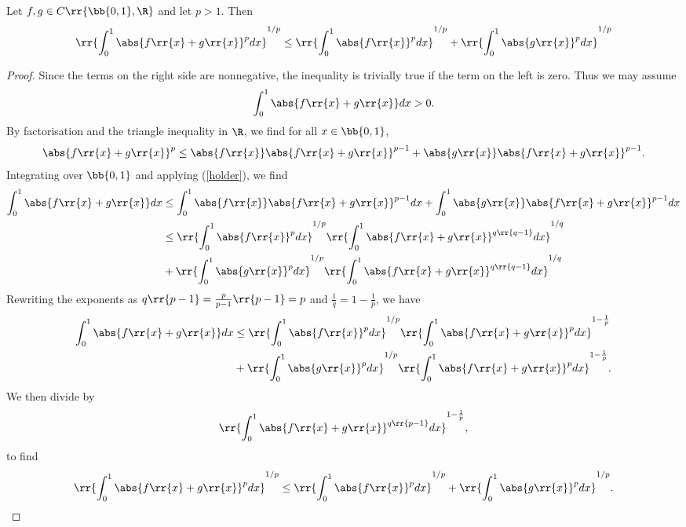 \documentclass{article}
\begin{document}
\begin{claim*}[2b]
  Let $f,g\in C\rr{\bb{0,1},\R}$ and let $p>1$. Then
  \begin{align*}
    \rr{\int_{0}^{1} \abs{f\rr{x}+g\rr{x}}^p dx}^{1/p} \leq \rr{\int_{0}^{1} \abs{f\rr{x}}^p dx}^{1/p} + \rr{\int_{0}^{1} \abs{g\rr{x}}^p dx}^{1/p}
  \end{align*}
  \begin{proof}
    Since the terms on the right side are nonnegative, the inequality is trivially true if the term on the left is zero.
    Thus we may assume
    \begin{align*}
      \int_{0}^{1} \abs{f\rr{x}+g\rr{x}} dx > 0.
    \end{align*}
    By factorisation and the triangle inequality in $\R$, we find for all $x\in\bb{0,1}$,
    \begin{align*}
      \abs{f\rr{x}+g\rr{x}}^p\leq \abs{f\rr{x}}\abs{f\rr{x}+g\rr{x}}^{p-1} + \abs{g\rr{x}}\abs{f\rr{x}+g\rr{x}}^{p-1}.
    \end{align*}
    Integrating over $\bb{0,1}$ and applying (\ref{holder}), we find
    \begin{align*}
      \int_{0}^{1} \abs{f\rr{x}+g\rr{x}} dx & \leq \int_0^1 \abs{f\rr{x}}\abs{f\rr{x}+g\rr{x}}^{p-1} dx + \int_0^1 \abs{g\rr{x}}\abs{f\rr{x}+g\rr{x}}^{p-1} dx \\
                                            & \leq \rr{\int_{0}^{1} \abs{f\rr{x}}^p dx}^{1/p} \rr{\int_{0}^{1} \abs{f\rr{x}+g\rr{x}}^{q\rr{q-1}} dx}^{1/q} \\
                                            & + \rr{\int_{0}^{1} \abs{g\rr{x}}^p dx}^{1/p} \rr{\int_{0}^{1} \abs{f\rr{x}+g\rr{x}}^{q\rr{q-1}} dx}^{1/q}
    \end{align*}
    Rewriting the exponents as $q\rr{p-1}=\frac{p}{p-1}\rr{p-1} = p$  and $\frac{1}{q}=1-\frac{1}{p}$, we have
    \begin{align*}
      \int_{0}^{1} \abs{f\rr{x}+g\rr{x}} dx & \leq \rr{\int_{0}^{1} \abs{f\rr{x}}^p dx}^{1/p} \rr{\int_{0}^{1} \abs{f\rr{x}+g\rr{x}}^{p} dx}^{1-\frac{1}{p}} \\
                                            & + \rr{\int_{0}^{1} \abs{g\rr{x}}^p dx}^{1/p} \rr{\int_{0}^{1} \abs{f\rr{x}+g\rr{x}}^{p} dx}^{1-\frac{1}{p}}.
    \end{align*}
    We then divide by
    \begin{align*}
      \rr{\int_{0}^{1} \abs{f\rr{x} + g\rr{x}}^{q\rr{p-1}} dx}^{1-\frac{1}{p}},
    \end{align*}
    to find
    \begin{align*}
      \rr{\int_{0}^{1} \abs{f\rr{x}+g\rr{x}}^p dx}^{1/p} \leq \rr{\int_{0}^{1} \abs{f\rr{x}}^p dx}^{1/p} + \rr{\int_{0}^{1} \abs{g\rr{x}}^p dx}^{1/p}.
    \end{align*}
  \end{proof}
\end{claim*}
\end{document}
